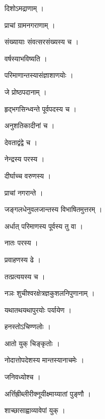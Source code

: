 \documentclass[10pt, openany]{book}
\begin{document}
\noindent दिशोऽमद्राणाम् ।

\noindent प्राचां ग्रामनगराणाम् ।

\noindent संख्यायाः संवत्सरसंख्यस्य च ।

\noindent वर्षस्याभविष्यति ।

\noindent परिमाणान्तस्यासंज्ञाशाणयोः ।

\noindent जे प्रोष्ठपदानाम् ।

\noindent हृद्भगसिन्ध्वन्ते पूर्वपदस्य च ।

\noindent अनुशतिकादीनां च ।

\noindent देवताद्वंद्वे च ।

\noindent नेन्द्रस्य परस्य ।

\noindent दीर्घाच्च वरुणस्य ।

\noindent प्राचां नगरान्ते ।

\noindent जङ्गलधेनुवलजान्तस्य विभाषितमुत्तरम् ।

\noindent अर्धात् परिमाणस्य पूर्वस्य तु वा ।

\noindent नातः परस्य ।

\noindent प्रवाहणस्य ढे ।

\noindent तत्प्रत्ययस्य च ।

\noindent नञः शुचीश्वरक्षेत्रज्ञकुशलनिपुणानाम् ।

\noindent यथातथयथापुरयोः पर्यायेण ।

\noindent हनस्तोऽचिण्णलोः ।

\noindent आतो युक् चिङ्कृतोः ।

\noindent नोदात्तोपदेशस्य मान्तस्यानाचमेः ।

\noindent जनिवध्योश्च ।

\noindent अर्त्तिह्रीब्लीरीक्नूयीक्ष्माय्यातां पुङ्णौ ।

\noindent शाच्छासाह्वाव्यावेपां युक् ।
\end{document}
